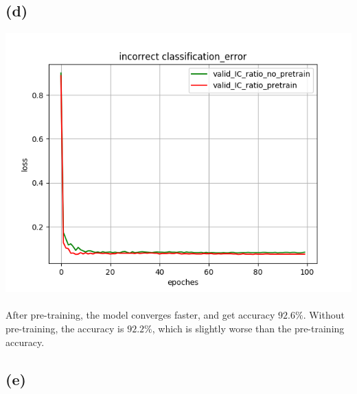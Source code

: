 \documentclass[twoside]{article}
\begin{document}
\subsection{(d)}
 
\includegraphics[width=0.5\linewidth]{code/problem_d_IC_926}
\paragraph{} After pre-training, the model converges faster, and get accuracy $92.6\%$. Without pre-training, the accuracy is $92.2\%$, which is slightly worse than the pre-training accuracy.

\subsection{(e)}
\end{document}
